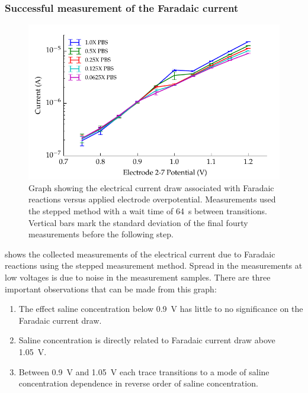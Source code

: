         \subsubsection*{Successful measurement of the Faradaic current}
        \begin{figure}
          \centering
          \includegraphics{content/pt2/08-InterfaceParameters/graphics/graph_currentVoltage_logY_Thesis}
          \caption{\label{fig:graph_currentVoltage_logY_Thesis}Graph showing the electrical current draw associated with Faradaic reactions versus applied electrode overpotential. Measurements used the stepped method with a wait time of \SI{64}{\second} between transitions. Vertical bars mark the standard deviation of the final fourty measurements before the following step.}
        \end{figure}
         shows the collected measurements of the electrical current due to Faradaic reactions using the stepped measurement method.
        Spread in the measurements at low voltages is due to noise in the measurement samples.
        There are three important observations that can be made from this graph:
        \begin{enumerate}
          \item The effect saline concentration below \SI{0.9}{\volt} has little to no significance on the Faradaic current draw.
          \item Saline concentration is directly related to Faradaic current draw above \SI{1.05}{\volt}.
          \item Between \SI{0.9}{\volt} and \SI{1.05}{\volt} each trace transitions to a mode of saline concentration dependence in reverse order of saline concentration.
        \end{enumerate}

